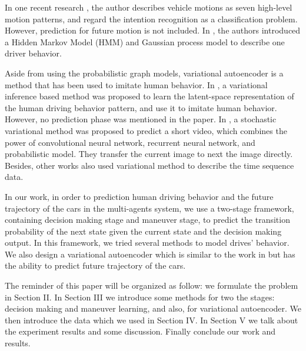 \documentclass[conference]{IEEEtran}
\begin{document}
In one recent research \cite{ref:6}, the author describes vehicle motions as seven high-level motion patterns, and regard the intention recognition as a classification problem. However, prediction for future motion is not included. In \cite{ref:7}, the authors introduced a Hidden Markov Model (HMM) and Gaussian process model to describe one driver behavior. 

Aside from using the probabilistic graph models, variational autoencoder is a method that has been used to imitate human behavior. In \cite{ref:8}, a variational inference based method was proposed to learn the latent-space representation of the human driving behavior pattern, and use it to imitate human behavior. However, no prediction phase was mentioned in the paper. In \cite{ref:9}, a stochastic variational method was proposed to predict a short video, which combines the power of convolutional neural network, recurrent neural network, and probabilistic model. They transfer the current image to next the image directly.
Besides, other works \cite{ref:10,ref:11,ref:12} also used variational method to describe the time sequence data.

In our work, in order to prediction human driving behavior and the future trajectory of the cars in the multi-agents system, we use a two-stage framework, containing decision making stage and maneuver stage, to predict the transition probability of the next state given the current state and the decision making output. In this framework, we tried several methods to model drives' behavior. We also design a variational autoencoder which is similar to the work in \cite{ref:8} but has the ability to predict future trajectory of the cars.

 
The reminder of this paper will be organized as follow: we formulate the problem in Section II. In Section III we introduce some methods for two the stages: decision making and maneuver learning, and also, for variational autoencoder. We then introduce the data which we used in Section IV. In Section V we talk about the experiment results and some discussion. Finally conclude our work and results. 
\end{document}
